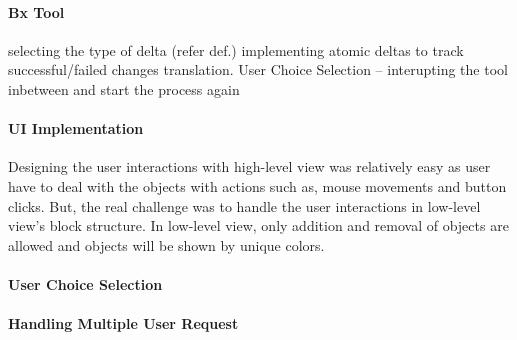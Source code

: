 \paragraph{Bx Tool}
selecting the type of delta (refer def.)
implementing atomic deltas to track successful/failed changes translation. 
User Choice Selection -- interupting the tool inbetween and start the process again

\paragraph{UI Implementation}
Designing the user interactions with high-level view was relatively easy as user have to deal with the objects with actions such as, mouse movements and button clicks. But, the real challenge was to handle the user interactions in low-level view's block structure. In low-level view, only addition and removal of objects are allowed and objects will be shown by unique colors. 

\paragraph{User Choice Selection}

\paragraph{Handling Multiple User Request}
 



